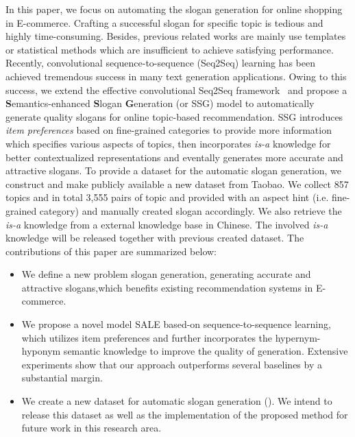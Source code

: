 In this paper, we focus on automating the slogan generation
for online shopping in E-commerce.
Crafting a successful slogan for specific topic is tedious and highly time-consuming.
Besides, previous related works are mainly use templates or statistical methods which are insufficient to achieve satisfying performance.
Recently, convolutional sequence-to-sequence (Seq2Seq) learning has been achieved tremendous success in many text generation applications.
Owing to this success, 
we extend the effective convolutional Seq2Seq framework~\cite{ott2019fairseq}
and propose a 
\textbf{S}emantics-enhanced \textbf{S}logan \textbf{G}eneration (or SSG) 
model to automatically generate quality slogans for 
online topic-based recommendation.
SSG introduces \emph{item preferences} based on fine-grained categories
to provide more information which specifies
various aspects of topics, then
incorporates \emph{is-a} knowledge for better contextualized representations
and eventally generates more accurate and attractive slogans.
To provide a dataset for the automatic slogan generation,
we construct and make publicly available a new dataset from Taobao.
We collect 857 topics and in total 3,555 pairs of topic and provided with an aspect hint (i.e. fine-grained category)
and manually created slogan accordingly.
We also retrieve the \emph{is-a} knowledge
from a external knowledge base in Chinese.
The involved \emph{is-a} knowledge will be released together with previous created dataset.
The contributions of this paper are summarized below:
\begin{itemize}
	\item We define a new problem slogan generation, 
	generating accurate and attractive slogans,which benefits existing
	recommendation systems in E-commerce.
	\item We propose a novel model SALE based-on sequence-to-sequence learning, 
	which utilizes item preferences and further incorporates the hypernym-hyponym semantic knowledge to improve the quality of generation. Extensive experiments show that our approach outperforms several baselines by a substantial margin.
	\item We create a new dataset for automatic slogan generation ().
	We intend to release this dataset as well as the implementation of the proposed method for future work in this research area. 
\end{itemize}


